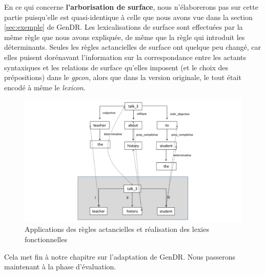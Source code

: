 En ce qui concerne \textbf{l'arborisation de surface}, nous n'élaborerons pas sur cette partie puisqu'elle est quasi-identique à celle que nous avons vue dans la section \ref{sec:exemple} de GenDR. Les lexicalisations de surface sont effectuées par la même règle que nous avons expliquée, de même que la règle qui introduit les déterminants. Seules les règles actancielles de surface ont quelque peu changé, car elles puisent dorénavant l'information sur la correspondance entre les actants syntaxiques et les relations de surface qu'elles imposent (et le choix des prépositions) dans le \emph{gpcon}, alors que dans la version originale, le tout était encodé à même le \emph{lexicon}.

\begin{figure}[htb]
	\centering
	\includegraphics[width=1\textwidth, trim = {0cm 0.4cm 0cm 0.4cm},clip]{ch6/figs/final_implem.pdf}
	\caption{Applications des règles actancielles et réalisation des lexies fonctionnelles}
	\label{deroulement4}
\end{figure}

Cela met fin à notre chapitre sur l'adaptation de GenDR. Nous passerons maintenant à la phase d'évaluation.